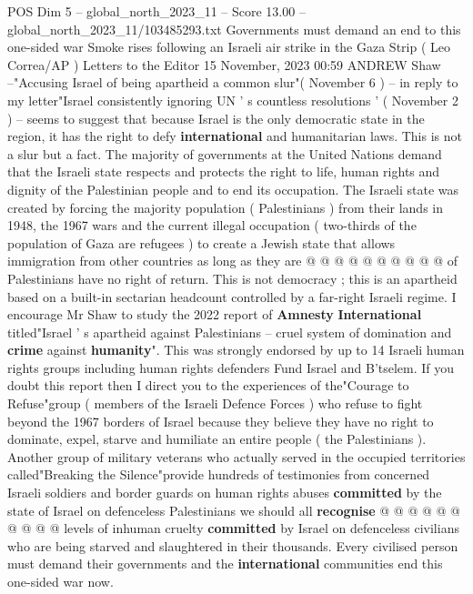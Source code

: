 \begin{textsample}{POS Dim 5 – global\_north\_2023\_11 – Score 13.00 – global\_north\_2023\_11/103485293.txt}  \label{ex:f5_pos_416}
Governments must demand an end to this one-sided war Smoke rises following an Israeli air strike in the Gaza Strip ( Leo Correa/AP ) Letters to the Editor 15 November, 2023 00:59 ANDREW Shaw --"Accusing Israel of being apartheid a common slur"( November 6 ) -- in reply to my letter"Israel consistently ignoring UN ' s countless resolutions ' ( November 2 ) -- seems to suggest that because Israel is the only democratic state in the region, it has the right to defy \textbf{international} and humanitarian laws.
This is not a slur but a fact.
The majority of governments at the United Nations demand that the Israeli state respects and protects the right to life, human rights and dignity of the Palestinian people and to end its occupation.
The Israeli state was created by forcing the majority population ( Palestinians ) from their lands in 1948, the 1967 wars and the current illegal occupation ( two-thirds of the population of Gaza are refugees ) to create a Jewish state that allows immigration from other countries as long as they are @ @ @ @ @ @ @ @ @ @ of Palestinians have no right of return.
This is not democracy ; this is an apartheid based on a built-in sectarian headcount controlled by a far-right Israeli regime.
I encourage Mr Shaw to study the 2022 report of \textbf{Amnesty} \textbf{International} titled"Israel ' s apartheid against Palestinians -- cruel system of domination and \textbf{crime} against \textbf{humanity}".
This was strongly endorsed by up to 14 Israeli human rights groups including human rights defenders Fund Israel and B'tselem.
If you doubt this report then I direct you to the experiences of the"Courage to Refuse"group ( members of the Israeli Defence Forces ) who refuse to fight beyond the 1967 borders of Israel because they believe they have no right to dominate, expel, starve and humiliate an entire people ( the Palestinians ).
Another group of military veterans who actually served in the occupied territories called"Breaking the Silence"provide hundreds of testimonies from concerned Israeli soldiers and border guards on human rights abuses \textbf{committed} by the state of Israel on defenceless Palestinians we should all \textbf{recognise} @ @ @ @ @ @ @ @ @ @ levels of inhuman cruelty \textbf{committed} by Israel on defenceless civilians who are being starved and slaughtered in their thousands.
Every civilised person must demand their governments and the \textbf{international} communities end this one-sided war now.

\end{textsample}
